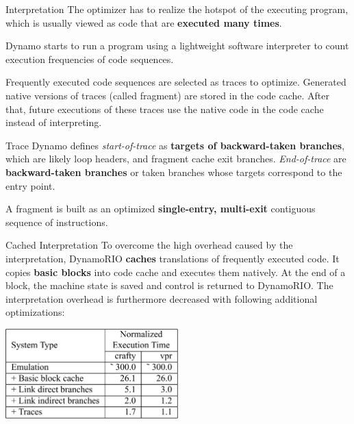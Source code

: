 \documentclass[aspectratio=169,xcolor=x11names]{beamer}
\begin{document}
	\begin{frame}{Interpretation}
		The optimizer has to realize the hotspot of the executing program, which is usually viewed as code that are \textbf{executed many times}.
		
		\alert{Dynamo} starts to run a program using a lightweight \alert{software interpreter} to count execution frequencies of code sequences.
		
		Frequently executed code sequences are selected as \alert{traces} to optimize. Generated native versions of traces (called \alert{fragment}) are stored in the \alert{code cache}. After that, future executions of these traces use the native code in the code cache instead of interpreting.
	\end{frame}

	\begin{frame}{Trace}
		Dynamo defines \textit{start-of-trace} as \textbf{targets of backward-taken branches}, which are likely loop headers, and fragment cache exit branches. \textit{End-of-trace} are \textbf{backward-taken branches} or taken branches whose targets correspond to the entry point.
		
		A fragment is built as an optimized \textbf{single-entry, multi-exit} contiguous sequence of instructions.
	\end{frame}

	\begin{frame}{Cached Interpretation}
		To overcome the high overhead caused by the interpretation, \alert{DynamoRIO} \textbf{caches} translations of frequently executed code. It copies \textbf{basic blocks} into code cache and executes them natively. At the end of a block, the machine state is saved and control is returned to DynamoRIO. The interpretation overhead is furthermore decreased with following additional optimizations:
		
		\begin{center}
			\includegraphics[width=0.5\textwidth]{DynamoRIO-interpretation-cache}
		\end{center}
	\end{frame}
\end{document}
